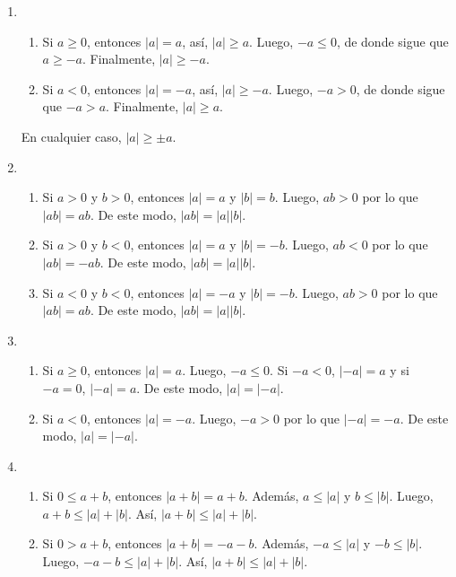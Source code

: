 \documentclass[11pt]{article}
\begin{document}
\begin{enumerate}[label=\alph*),font=\bfseries]


    \item
        \begin{enumerate}[label=\roman*),font=\bfseries]
            \item Si $a \geq 0$, entonces $|a|=a$, así, $|a| \geq a$. Luego, $-a \leq 0$, de donde sigue que $a \geq -a$. Finalmente, $|a| \geq -a$.
            \item Si $a<0$, entonces $|a|=-a$, así, $|a| \geq -a$. Luego, $-a>0$, de donde sigue que $-a>a$. Finalmente, $|a| \geq a$.
        \end{enumerate}
        En cualquier caso, $|a| \geq \pm a$.


    \item 
        \begin{enumerate}[label=\roman*),font=\bfseries]
            \item Si $a>0$ y $b>0$, entonces $|a|=a$ y $|b|=b$. Luego, $ab>0$ por lo que $|ab|=ab$. De este modo, $|ab| =|a||b|$.
            \item Si $a>0$ y $b<0$, entonces $|a|=a$ y $|b|=-b$. Luego, $ab<0$ por lo que $|ab|=-ab$. De este modo, $|  ab|=|a||b|$.
            \item Si $a<0$ y $b<0$, entonces $|a|=-a$ y $|b|=-b$. Luego, $ab>0$ por lo que $|ab|=ab$. De este modo, $|  ab|=|a||b|$.
        \end{enumerate}


    \item 
        \begin{enumerate}[label=\roman*),font=\bfseries]
            \item Si $a \geq 0$, entonces $|a|=a$. Luego, $-a \leq 0$. Si $-a<0$, $|-a|=a$ y si $-a=0$, $|-a|=a$. De este modo, $|a|=|-a|$.
            \item Si $a<0$, entonces $|a|=-a$. Luego, $-a>0$ por lo que $|-a|=-a$. De este modo, $|a|=|-a|$.
        \end{enumerate}

    
    \item 
        \begin{enumerate}[label=\roman*),font=\bfseries]
            \item Si $0 \leq a+b$, entonces $|a+b|=a+b$. Además, $a \leq |a|$ y $b \leq |b|$. Luego, $a+b \leq |a|+|b|$. Así, $|a+b| \leq |a|+|b|$.
            \item Si $0 > a+b$, entonces $|a+b|=-a-b$. Además, $-a \leq |a|$ y $-b \leq |b|$. Luego, $-a-b \leq |a|+|b|$. Así, $|a+b| \leq |a|+|b|$.
        \end{enumerate}
    

\end{enumerate}
\end{document}
